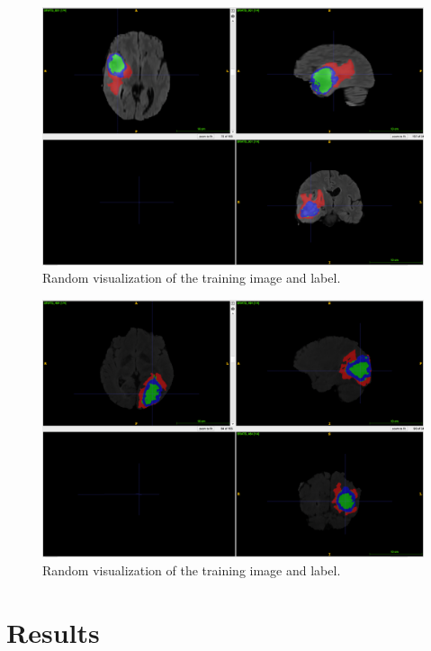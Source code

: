 \documentclass[10pt,twocolumn,letterpaper]{article}
\begin{document}
\begin{figure}[h]
   \begin{center}
      \includegraphics[width=0.95\linewidth]{images/visualization1.png}
   \end{center}
   \caption{Random visualization of the training image and label.}
\label{fig: viz1}
\end{figure}

\begin{figure}[h]
   \begin{center}
      \includegraphics[width=0.95\linewidth]{images/visualization2.png}
   \end{center}
   \caption{Random visualization of the training image and label.}
\label{fig: viz2}
\end{figure}


\section{Results}
\end{document}
